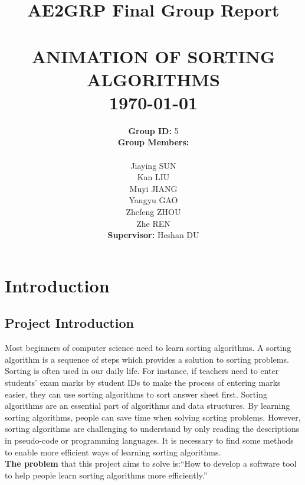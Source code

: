 \documentclass[paper=a4, fontsize=11pt,twoside]{scrartcl}		%
\title{	\LARGE \textbf{AE2GRP Final Group Report} 	%
		 	\\[2.0cm]													%
			\HRule{0.5pt} \\										%
			\LARGE \textbf{\uppercase{Animation of Sorting Algorithms}}	%
			\HRule{2pt} \\ [0.5cm]								%
			\normalsize \today									%
		}
\author{
\begin{tabbing}
      \hspace{5.1cm}\= \textbf{Group ID:} \quad\quad\= 5\\
      			  \>\textbf{Group Members: }\\ 
                  \\
                  \> Jiaying SUN       \> 6515778\\
                  \> Kan LIU     	   \> 6515770\\
                  \> Muyi JIANG        \> 6513225\\
                  \> Yangyu GAO        \> 6515761\\
                  \> Zhefeng ZHOU      \> 6515792\\
                  \> Zhe REN      	   \> 6515775
    \end{tabbing}
				\textbf{Supervisor: } Heshan DU\\	
        }
\makeatletter
\def\printtitle{%
    {\centering \@title\par}}
\def\printauthor{%
    {\centering\large \@author}}
\makeatother
\begin{document}
\thispagestyle{empty}				%
\printtitle									%
  	\vfill
\printauthor								%
\cleardoublepage

\newpage
\tableofcontents
\thispagestyle{empty}	
\newpage
\cleardoublepage


\setcounter{page}{1}


\section{Introduction}

\subsection{Project Introduction}
Most beginners of computer science need to learn sorting algorithms. A sorting algorithm is a sequence of steps which provides a solution to sorting problems. Sorting is often used in our daily life. For instance, if teachers need to enter students' exam marks by student IDs to make the process of entering marks easier, they can use sorting algorithms to sort answer sheet first. Sorting algorithms are an essential part of algorithms and data structures. By learning sorting algorithms, people can save time when solving sorting problems. However, sorting algorithms are challenging to understand by only reading the descriptions in pseudo-code or programming languages. It is necessary to find some methods to enable more efficient ways of learning sorting algorithms.\\

\textbf{The problem} that this project aims to solve is:``How to develop a software tool to help people learn sorting algorithms more efficiently.''\\
\end{document}
